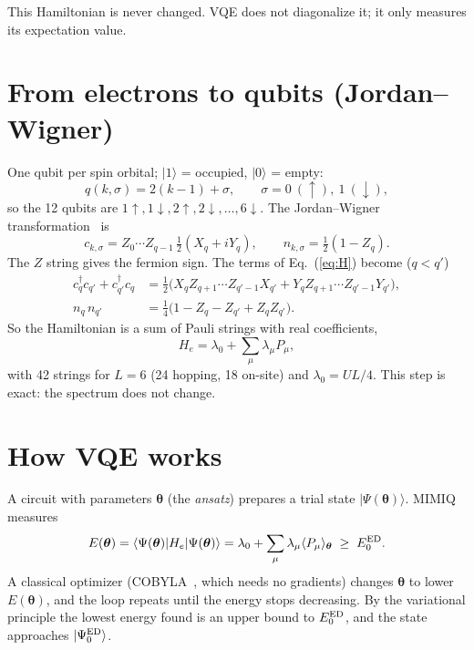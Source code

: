 \documentclass[11pt,a4paper]{article}
\newcommand{\cd}{c^\dagger}
\newcommand{\up}{\uparrow}
\newcommand{\dn}{\downarrow}
\begin{document}
This Hamiltonian is never changed. VQE does not diagonalize it; it only
measures its expectation value.

\section{From electrons to qubits (Jordan--Wigner)}

One qubit per spin orbital; $|1\rangle$ = occupied, $|0\rangle$ = empty:
\begin{equation}
  q(k,\sigma) = 2(k-1) + \sigma , \qquad \sigma = 0\ (\up),\ 1\ (\dn),
\end{equation}
so the 12 qubits are $1\up, 1\dn, 2\up, 2\dn, \dots, 6\dn$. The
Jordan--Wigner transformation~\cite{jw} is
\begin{equation}
  c_{k,\sigma} = Z_0 \cdots Z_{q-1}\,\tfrac12 (X_q + iY_q) , \qquad
  n_{k,\sigma} = \tfrac12 (1 - Z_q) .
\end{equation}
The $Z$ string gives the fermion sign. The terms of Eq.~(\ref{eq:H}) become
($q < q'$)
\begin{align}
  \cd_{q} c_{q'} + \cd_{q'} c_{q} &= \tfrac12 \big( X_q Z_{q+1}\cdots Z_{q'-1} X_{q'} + Y_q Z_{q+1}\cdots Z_{q'-1} Y_{q'} \big) , \\
  n_q\, n_{q'} &= \tfrac14 \big( 1 - Z_q - Z_{q'} + Z_q Z_{q'} \big) .
\end{align}
So the Hamiltonian is a sum of Pauli strings with real coefficients,
\begin{equation}\label{eq:Hpauli}
  H_e = \lambda_0 + \sum_\mu \lambda_\mu P_\mu ,
\end{equation}
with 42 strings for $L = 6$ (24 hopping, 18 on-site) and $\lambda_0 = UL/4$.
This step is exact: the spectrum does not change.

\section{How VQE works}

A circuit with parameters $\boldsymbol\theta$ (the \emph{ansatz}) prepares a
trial state $|\Psi(\boldsymbol\theta)\rangle$. MIMIQ measures
\begin{equation}
  E(\boldsymbol\theta) = \langle \Psi(\boldsymbol\theta)| H_e |\Psi(\boldsymbol\theta)\rangle
  = \lambda_0 + \sum_\mu \lambda_\mu \langle P_\mu\rangle_{\boldsymbol\theta}
  \;\ge\; E_0^{\rm ED} .
\end{equation}
A classical optimizer (COBYLA~\cite{cobyla}, which needs no gradients) changes
$\boldsymbol\theta$ to lower $E(\boldsymbol\theta)$, and the loop repeats until
the energy stops decreasing. By the variational principle the lowest energy
found is an upper bound to $E_0^{\rm ED}$, and the state approaches $|\Psi_0^{\rm ED}\rangle$.
\end{document}
